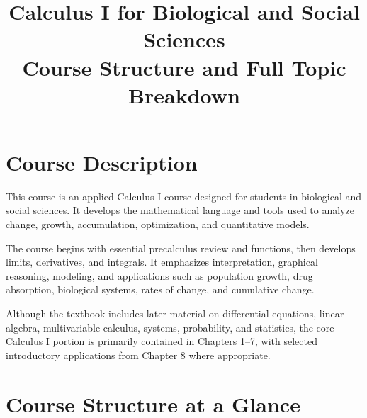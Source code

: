 \documentclass[11pt]{article}
\title{\textbf{Calculus I for Biological and Social Sciences}\\
Course Structure and Full Topic Breakdown}
\author{}
\date{}
\begin{document}
\maketitle

\section{Course Description}

This course is an applied Calculus I course designed for students in biological and social sciences. It develops the mathematical language and tools used to analyze change, growth, accumulation, optimization, and quantitative models.

The course begins with essential precalculus review and functions, then develops limits, derivatives, and integrals. It emphasizes interpretation, graphical reasoning, modeling, and applications such as population growth, drug absorption, biological systems, rates of change, and cumulative change.

Although the textbook includes later material on differential equations, linear algebra, multivariable calculus, systems, probability, and statistics, the core Calculus I portion is primarily contained in Chapters 1--7, with selected introductory applications from Chapter 8 where appropriate.

\section{Course Structure at a Glance}
\end{document}
